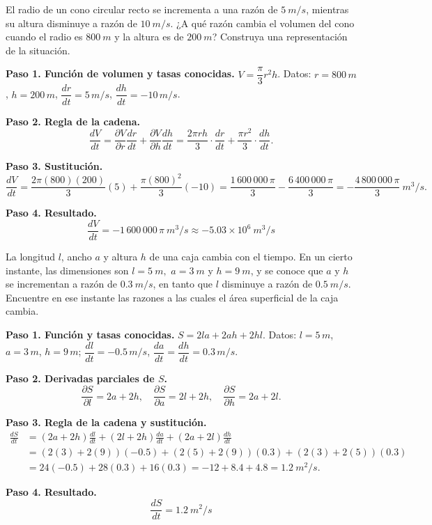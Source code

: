 \begin{prob}
El radio de un cono circular recto se incrementa a una razón de $5\ m/s$, mientras su altura disminuye a razón de $10\ m/s$. ¿A qué razón cambia el volumen del cono cuando el radio es $800\ m$ y la altura es de $200\ m$? Construya una representación de la situación.
\begin{myproof}
\textbf{Paso 1. Función de volumen y tasas conocidas.}
$V=\dfrac{\pi}{3}r^2h$. Datos: $r=800\,m$, $h=200\,m$, $\dfrac{dr}{dt}=5\,m/s$, $\dfrac{dh}{dt}=-10\,m/s$.

\textbf{Paso 2. Regla de la cadena.}
\[
\frac{dV}{dt}=\frac{\partial V}{\partial r}\frac{dr}{dt}+\frac{\partial V}{\partial h}\frac{dh}{dt}
=\frac{2\pi r h}{3}\cdot\frac{dr}{dt}+\frac{\pi r^2}{3}\cdot\frac{dh}{dt}.
\]

\textbf{Paso 3. Sustitución.}
\[
\frac{dV}{dt}
=\frac{2\pi(800)(200)}{3}(5)+\frac{\pi(800)^2}{3}(-10)
=\frac{1\,600\,000\,\pi}{3}-\frac{6\,400\,000\,\pi}{3}
=-\frac{4\,800\,000\,\pi}{3}\ m^3/s.
\]

\textbf{Paso 4. Resultado.}
\[
\boxed{\frac{dV}{dt}=-1\,600\,000\,\pi\ m^3/s\approx -5.03\times10^6\ m^3/s}
\]
\end{myproof}
\end{prob}

\begin{prob}
La longitud $l$, ancho $a$ y altura $h$ de una caja cambia con el tiempo. En un cierto instante, las dimensiones son $l= 5\ m,$ $a=3\ m$ y $h= 9\ m$, y se conoce que $a$ y $h$ se incrementan a razón de $0.3\ m/s$, en tanto que $l$ disminuye a razón de $0.5\ m/s.$ Encuentre en ese instante las razones a las cuales el área superficial de la caja cambia.
\begin{myproof}
\textbf{Paso 1. Función y tasas conocidas.}
$S=2la+2ah+2hl$. Datos: $l=5\,m$, $a=3\,m$, $h=9\,m$; $\dfrac{dl}{dt}=-0.5\,m/s$, $\dfrac{da}{dt}=\dfrac{dh}{dt}=0.3\,m/s$.

\textbf{Paso 2. Derivadas parciales de $S$.}
\[
\frac{\partial S}{\partial l}=2a+2h,\quad
\frac{\partial S}{\partial a}=2l+2h,\quad
\frac{\partial S}{\partial h}=2a+2l.
\]

\textbf{Paso 3. Regla de la cadena y sustitución.}
\[
\begin{aligned}
\frac{dS}{dt}&=(2a+2h)\frac{dl}{dt}+(2l+2h)\frac{da}{dt}+(2a+2l)\frac{dh}{dt}\\
&=(2(3)+2(9))(-0.5)+(2(5)+2(9))(0.3)+(2(3)+2(5))(0.3)\\
&=24(-0.5)+28(0.3)+16(0.3)
=-12+8.4+4.8=1.2\ m^2/s.
\end{aligned}
\]

\textbf{Paso 4. Resultado.}
\[
\boxed{\frac{dS}{dt}=1.2\ m^2/s}
\]
\end{myproof}
\end{prob}

